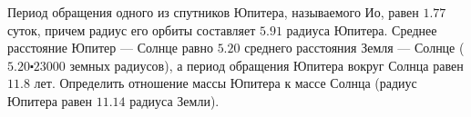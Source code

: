 Период обращения одного из спутников Юпитера, называемого Ио, равен $1.77$ суток, причем радиус его орбиты составляет 
$5.91$ радиуса Юпитера. Среднее расстояние Юпитер --- Солнце равно $5.20$ среднего расстояния Земля ---  Солнце ($5.20\centerdot 23 000$ земных радиусов), а период обращения Юпитера вокруг Солнца равен $11.8$ лет. Определить 
отношение массы Юпитера к массе Солнца (радиус Юпитера равен $11.14$ радиуса Земли).